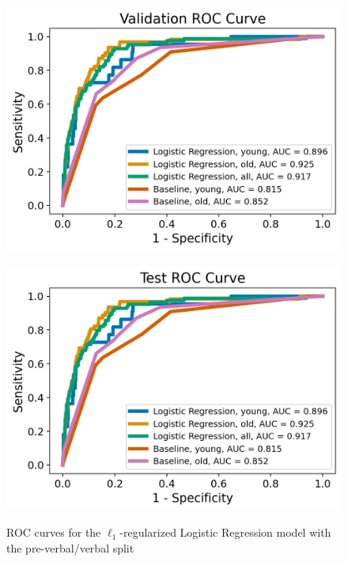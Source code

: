 \documentclass[11pt, letterpaper]{amsart}
\begin{document}
\begin{figure}
	\begin{minipage}[b]{0.5\linewidth}
		\centering
		\includegraphics[width=\textwidth]{lr_val_roc_verbal.png}
		\label{fig:lr_val_roc_vb}
	\end{minipage}%
	\begin{minipage}[b]{0.5\linewidth}
		\centering
		\includegraphics[width=\textwidth]{lr_test_roc_verbal.png}
		\label{fig:lr_test_roc_vb}
	\end{minipage}
	\caption{ROC curves for the $\ell_1$-regularized Logistic Regression model with the pre-verbal/verbal split}\label{fig:lr_roc_vb}
\end{figure}
\end{document}
